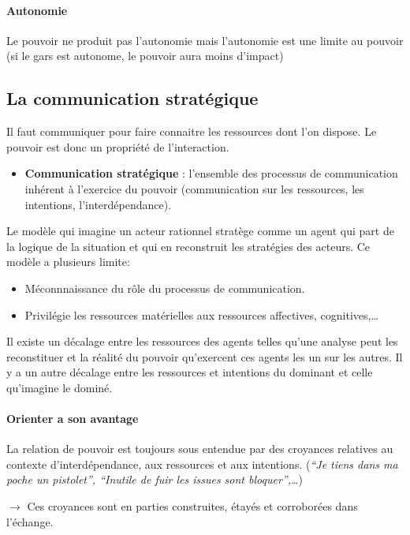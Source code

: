 \documentclass[11pt]{article} %
\begin{document}
\paragraph{Autonomie} Le pouvoir ne produit pas l'autonomie mais
l'autonomie est une limite au pouvoir (si le gars est autonome, le
pouvoir aura moins d'impact)

\subsection{La communication stratégique}
Il faut communiquer pour faire connaitre les ressources dont l'on
dispose. Le pouvoir est donc un propriété de l'interaction.

\begin{itemize}
    \item[] \textbf{Communication stratégique} : l'ensemble des processus de
communication inhérent à l'exercice du pouvoir (communication sur les
ressources, les intentions, l'interdépendance).
\end{itemize}

Le modèle qui imagine un acteur rationnel stratège comme un agent qui
part de la logique de la situation et qui en reconstruit les stratégies
des acteurs. Ce modèle a plusieurs limite:

 \begin{itemize}
	\item Méconnnaissance du rôle du processus de communication.
	\item Privilégie les ressources matérielles aux ressources
        affectives, cognitives,\ldots
\end{itemize}


Il existe un décalage entre les ressources des agents telles qu'une
analyse peut les reconstituer et la réalité du pouvoir qu'exercent ces
agents les un sur les autres.  Il y a un autre décalage entre les
ressources et intentions du dominant et celle qu'imagine le dominé.

\paragraph{Orienter a son avantage}

La relation de pouvoir est toujours sous entendue par des croyances
relatives au contexte d'interdépendance, aux ressources et aux
intentions. (\textit{``Je tiens dans ma poche un pistolet'', ``Inutile
de fuir les issues sont bloquer'',\ldots})

$\to$ Ces croyances sont en parties construites, étayés et corroborées dans
l'échange.
\end{document}
